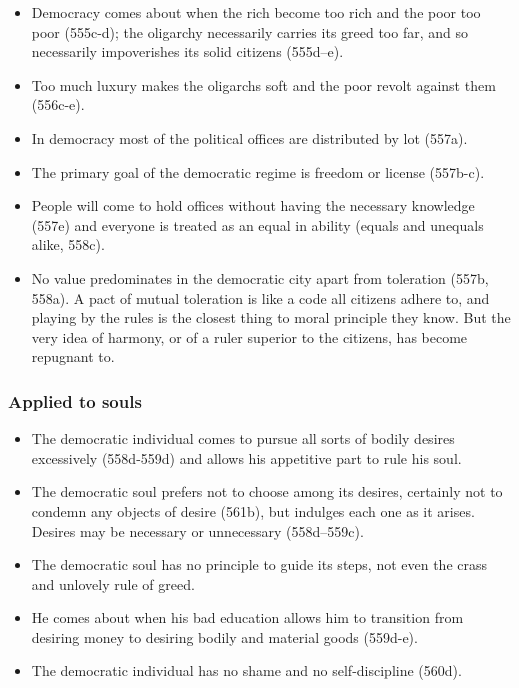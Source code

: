 \documentclass[oneside]{article}
\begin{document}
\begin{itemize}
\item Democracy comes about when the rich become too rich and
the poor too poor (555c-d); the oligarchy necessarily carries its greed
too far, and so necessarily impoverishes its solid citizens (555d--e). 
\item Too much luxury makes the oligarchs soft and the poor revolt against
them (556c-e).
\item In democracy most of the political offices are distributed by lot
(557a).
\item The primary goal of the democratic regime is freedom or license
(557b-c).
\item People will come to hold offices without having the necessary
knowledge (557e) and everyone is treated as an equal in ability (equals
and unequals alike, 558c). 
\item No value predominates in the democratic city apart from toleration (557b, 558a). A pact of mutual toleration is
like a code all citizens adhere to, and playing by the rules is the closest
thing to moral principle they know. But the very idea of harmony, or of
a ruler superior to the citizens, has become repugnant to.
\end{itemize}

\subsubsection*{Applied to souls} 

\begin{itemize}
\item The democratic individual comes to pursue all sorts of
bodily desires excessively (558d-559d) and allows his appetitive part to
rule his soul.
\item The democratic soul prefers not to choose among its desires, certainly
not to condemn any objects of desire (561b), but indulges each one as it
arises. Desires may be necessary or unnecessary (558d--559c).
\item  The democratic soul has no principle to guide its steps, not even the crass
and unlovely rule of greed. 
\item He comes about when his bad education
allows him to transition from desiring money to desiring bodily and
material goods (559d-e).
\item The democratic individual has no shame and no self-discipline (560d).
\end{itemize}
\end{document}
